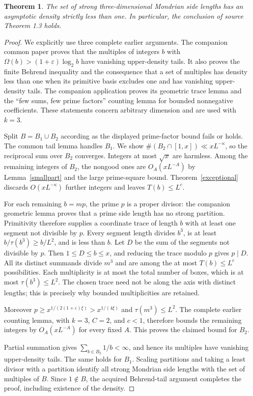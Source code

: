 \documentclass[11pt,a4paper]{article}
\newtheorem{theorem}{Theorem}
\newcommand{\Om}{\Omega}
\begin{document}
\begin{theorem}\label{density}
The set of strong three-dimensional Mondrian side lengths has an
asymptotic density strictly less than one. In particular, the conclusion
of source Theorem 1.3 holds.
\end{theorem}
\begin{proof}
We explicitly use three complete earlier arguments. The companion
common paper proves that the multiples of integers
$b$ with $\Om(b)>(1+\varepsilon)\log_2b$ have vanishing upper-density
tails. It also proves the finite Behrend inequality and the consequence
that a set of multiples has density less than one when its primitive
basis excludes one and has vanishing upper-density tails. The companion
application proves its geometric trace lemma and the ``few sums, few
prime factors'' counting lemma for bounded nonnegative coefficients.
These statements concern arbitrary dimension and are used with $k=3$.

Split $B=B_1\cup B_2$ according as the displayed prime-factor bound
fails or holds. The common tail lemma handles $B_1$. We show
$\#(B_2\cap[1,x])\ll xL^{-\kappa}$, so the reciprocal sum over
$B_2$ converges. Integers at most $\sqrt x$ are harmless. Among the
remaining integers of $B_2$, the nongood ones are $O_A(xL^{-A})$
by Lemma~\ref{smallpart} and the large prime-square bound.
Theorem~\ref{exceptional} discards $O(xL^{-\kappa})$ further
integers and leaves $T(b)\le L^c$.

For each remaining $b=mp$, the prime $p$ is a proper divisor: the
companion geometric lemma proves that a prime side length has no strong
partition. Primitivity therefore supplies a coordinate trace of length
$b$ with at least one segment not divisible by $p$.
Every segment length divides $b^3$, is at least
$b/\tau(b^3)\ge b/L^2$, and is less than $b$.
Let $D$ be the sum of the segments not divisible by $p$.
Then $1\le D\le b\le x$, and reducing the trace modulo $p$ gives
$p\mid D$. All its distinct summands divide $m^3$ and are among
the at most $T(b)\le L^c$ possibilities. Each multiplicity is at most
the total number of boxes, which is at most $\tau(b^3)\le L^2$.
The chosen trace need not be along the axis with distinct lengths;
this is precisely why bounded multiplicities are retained.

Moreover $p\ge x^{1/(2(1+\varepsilon)\xi)}>
x^{1/(4\xi)}$ and $\tau(m^3)\le L^2$.
The complete earlier counting lemma, with $k=3$, $C=2$, and $c<1$,
therefore bounds the remaining integers by $O_A(xL^{-A})$ for every
fixed $A$. This proves the claimed bound for $B_2$.

Partial summation gives $\sum_{b\in B_2}1/b<\infty$, and hence its
multiples have vanishing upper-density tails. The same holds for $B_1$.
Scaling partitions and taking a least divisor with a partition identify
all strong Mondrian side lengths with the set of multiples of $B$.
Since $1\notin B$, the acquired Behrend-tail argument completes the
proof, including existence of the density.
\end{proof}
\end{document}
